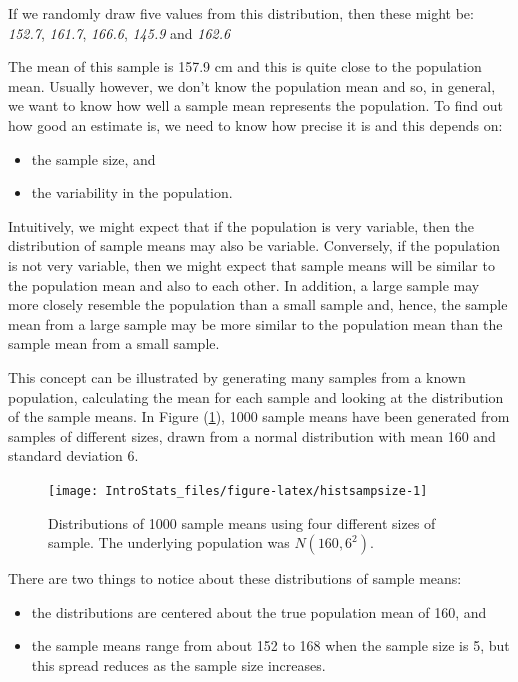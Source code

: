 \documentclass[
  oneside]{krantz}
\providecommand{\tightlist}{%
  \setlength{\itemsep}{0pt}\setlength{\parskip}{0pt}}
\begin{document}
If we randomly draw five values from this distribution, then these might be:
\emph{152.7}, \emph{161.7}, \emph{166.6}, \emph{145.9} and \emph{162.6}

The mean of this sample is 157.9 cm and this is quite close to the population mean. Usually however, we don't know the population mean and so, in general, we want to know how well a sample mean represents the population. To find out how good an estimate is, we need to know how precise it is and this depends on:

\begin{itemize}
\tightlist
\item
  the sample size, and
\item
  the variability in the population.
\end{itemize}

Intuitively, we might expect that if the population is very variable, then the distribution of sample means may also be variable. Conversely, if the population is not very variable, then we might expect that sample means will be similar to the population mean and also to each other. In addition, a large sample may more closely resemble the population than a small sample and, hence, the sample mean from a large sample may be more similar to the population mean than the sample mean from a small sample.

This concept can be illustrated by generating many samples from a known population, calculating the mean for each sample and looking at the distribution of the sample means. In Figure (\ref{fig:histsampsize}), 1000 sample means have been generated from samples of different sizes, drawn from a normal distribution with mean 160 and standard deviation 6.

\begin{figure}[!htb]

{\centering \texttt{[image: IntroStats\_files/figure-latex/histsampsize-1]} 

}

\caption{Distributions of 1000 sample means using four different sizes of sample. The underlying population was $N(160,6^2)$.}\label{fig:histsampsize}
\end{figure}

There are two things to notice about these distributions of sample means:

\begin{itemize}
\tightlist
\item
  the distributions are centered about the true population mean of 160,
  and
\item
  the sample means range from about 152 to 168 when the sample size is 5, but this spread reduces as the sample size increases.
\end{itemize}
\end{document}
